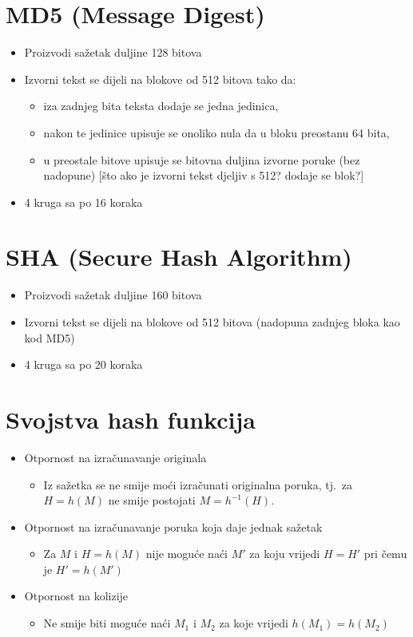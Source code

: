 \documentclass[11pt]{article}
\begin{document}
\section{MD5 (Message Digest)}
\begin{itemize}
  \item Proizvodi sažetak duljine 128 bitova
  \item Izvorni tekst se dijeli na blokove od 512 bitova tako da:
\begin{itemize}
  \item iza zadnjeg bita teksta dodaje se jedna jedinica,
  \item nakon te jedinice upisuje se onoliko nula da u bloku preostanu 64 bita,
  \item u preostale bitove upisuje se bitovna duljina izvorne poruke (bez nadopune) [što ako je izvorni tekst djeljiv s 512? dodaje se blok?]
\end{itemize}
  \item 4 kruga sa po 16 koraka
\end{itemize}

\section{SHA (Secure Hash Algorithm)}
\begin{itemize}
  \item Proizvodi sažetak duljine 160 bitova
  \item Izvorni tekst se dijeli na blokove od 512 bitova (nadopuna zadnjeg bloka kao kod MD5)
  \item 4 kruga sa po 20 koraka
\end{itemize}
\section{Svojstva hash funkcija}
\begin{itemize}
  \item Otpornost na izračunavanje originala
\begin{itemize}
  \item Iz sažetka se ne smije moći izračunati originalna poruka, tj.\ za $H = h(M)$ ne smije postojati $M = h^{-1}(H)$.
\end{itemize}
  \item Otpornost na izračunavanje poruka koja daje jednak sažetak
\begin{itemize}
  \item Za $M$ i $H = h(M)$ nije moguće naći $M'$ za koju vrijedi $H = H'$ pri čemu je $H' = h(M')$
\end{itemize}
  \item Otpornost na kolizije
\begin{itemize}
  \item Ne smije biti moguće naći $M_1$ i $M_2$ za koje vrijedi $h(M_1) = h(M_2)$
\end{itemize}
\end{itemize}
\end{document}
